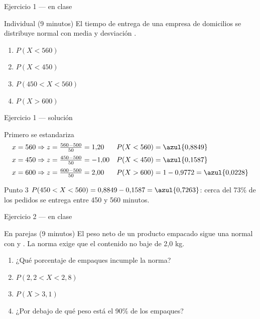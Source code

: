 \documentclass[aspectratio=169,10pt]{beamer}
\begin{document}
\begin{frame}{Ejercicio 1 — en clase}
  \begin{alertblock}{Individual (9 minutos)}
    El tiempo de entrega de una empresa de domicilios se distribuye normal con
    media  y desviación .

    \vspace{0.25cm}
    \begin{enumerate}
      \item $P(X<560)$
      \item $P(X<450)$
      \item $P(450<X<560)$
      \item $P(X>600)$
    \end{enumerate}
  \end{alertblock}
\end{frame}

\begin{frame}{Ejercicio 1 — solución}
  \small
  \begin{block}{Primero se estandariza}
    \begin{align*}
      x=560 &\Rightarrow z=\tfrac{560-500}{50}=1{,}20
        &&P(X<560)=\azul{0{,}8849}\\[0.2em]
      x=450 &\Rightarrow z=\tfrac{450-500}{50}=-1{,}00
        &&P(X<450)=\azul{0{,}1587}\\[0.2em]
      x=600 &\Rightarrow z=\tfrac{600-500}{50}=2{,}00
        &&P(X>600)=1-0{,}9772=\azul{0{,}0228}
    \end{align*}
  \end{block}

  \vspace{0.1cm}
  \begin{exampleblock}{Punto 3}
    \footnotesize
    $P(450<X<560)=0{,}8849-0{,}1587=\azul{0{,}7263}$: cerca del 73\% de los
    pedidos se entrega entre 450 y 560 minutos.
  \end{exampleblock}
\end{frame}

\begin{frame}{Ejercicio 2 — en clase}
  \begin{alertblock}{En parejas (9 minutos)}
    El peso neto de un producto empacado sigue una normal con
     y . La norma exige
    que el contenido no baje de 2{,}0 kg.

    \vspace{0.25cm}
    \begin{enumerate}
      \item ¿Qué porcentaje de empaques incumple la norma?
      \item $P(2{,}2<X<2{,}8)$
      \item $P(X>3{,}1)$
      \item ¿Por debajo de qué peso está el 90\% de los empaques?
    \end{enumerate}
  \end{alertblock}
\end{frame}
\end{document}
